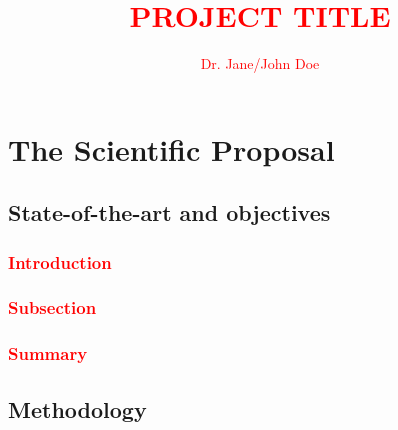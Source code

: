 \documentclass[B2,COG]{ercgrant}
\author{\textcolor{red}{Dr. Jane/John Doe}}
\title{\textcolor{red}{PROJECT TITLE}}
\begin{document}
\maketitle



\chapter{The Scientific Proposal}


\section{State-of-the-art and objectives}\label{sec:stateofart}

\color{red}
\subsection{\textcolor{red}{Introduction}}\label{sec:stateofart:intro}
\blindtext[5]

\subsection{\textcolor{red}{Subsection}}\label{sec:stateofart:subsection}
\blindtext[2]

\blindtext[2]

\subsection{\textcolor{red}{Summary}}\label{sec:stateofart:summary}
\blindtext[2]
\color{black}

\section{Methodology}
\color{red}
\blindtext[2]





\nocite{*} %

\renewcommand\bibsection{\section*{\refname}}


\end{document}

